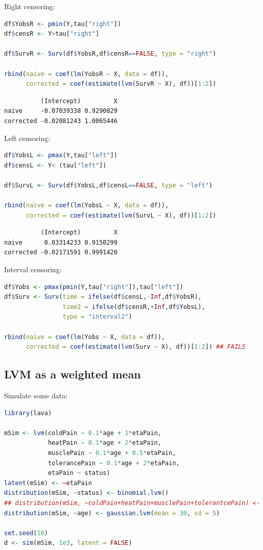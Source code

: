 \documentclass{article}
\begin{document}
Right censoring:
\begin{lstlisting}[language=r,numbers=none]
df$YobsR <- pmin(Y,tau["right"])
df$censR <- Y>tau["right"]

df$SurvR <- Surv(df$YobsR,df$censR==FALSE, type = "right")

rbind(naive = coef(lm(YobsR ~ X, data = df)),
      corrected = coef(estimate(lvm(SurvR ~ X), df))[1:2])
\end{lstlisting}

\label{}
\begin{verbatim}
          (Intercept)         X
naive     -0.07039338 0.9290829
corrected -0.02081243 1.0065446
\end{verbatim}


Left censoring:
\begin{lstlisting}[language=r,numbers=none]
df$YobsL <- pmax(Y,tau["left"])
df$censL <- Y< (tau["left"])

df$SurvL <- Surv(df$YobsL,df$censL==FALSE, type = "left")

rbind(naive = coef(lm(YobsL ~ X, data = df)),
      corrected = coef(estimate(lvm(SurvL ~ X), df))[1:2])
\end{lstlisting}

\label{}
\begin{verbatim}
          (Intercept)         X
naive      0.03314233 0.9150299
corrected -0.02171591 0.9991420
\end{verbatim}


Interval censoring:
\begin{lstlisting}[language=r,numbers=none]
df$Yobs <- pmax(pmin(Y,tau["right"]),tau["left"])
df$Surv <- Surv(time = ifelse(df$censL,-Inf,df$YobsR),
                time2 = ifelse(df$censR,+Inf,df$YobsL),
                type = "interval2")

rbind(naive = coef(lm(Yobs ~ X, data = df)),
      corrected = coef(estimate(lvm(Surv ~ X), df))[1:2]) ## FAILS
\end{lstlisting}
\subsection{LVM as a weighted mean}
\label{sec:orgf68cce8}
Simulate some data:
\begin{lstlisting}[language=r,numbers=none]
library(lava)

mSim <- lvm(coldPain ~ 0.1*age + 1*etaPain,
            heatPain ~ 0.1*age + 2*etaPain,
            musclePain ~ 0.1*age + 0.5*etaPain,
            tolerancePain ~ 0.1*age + 2*etaPain,
            etaPain ~ status)
latent(mSim) <- ~etaPain
distribution(mSim, ~status) <- binomial.lvm()
## distribution(mSim, ~coldPain+heatPain+musclePain+tolerantcePain) <- Gamma.lvm(rate = 2, shape = 10)
distribution(mSim, ~age) <- gaussian.lvm(mean = 30, sd = 5)

set.seed(10)
d <- sim(mSim, 1e3, latent = FALSE)
\end{lstlisting}
\end{document}
